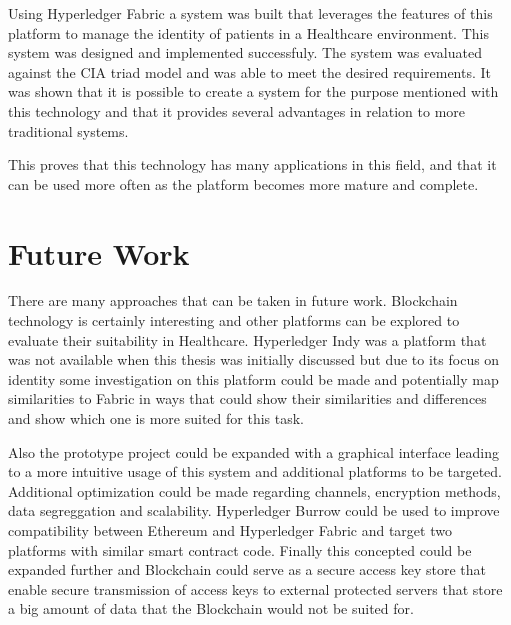 Using Hyperledger Fabric a system was built that leverages the features of this
platform to manage the identity of patients in a Healthcare environment. This
system was designed and implemented successfuly. The system was evaluated
against the CIA triad model and was able to meet the desired requirements. It
was shown that it is possible to create a system for the purpose mentioned with
this technology and that it provides several advantages in relation to more
traditional systems.

This proves that this technology has many applications in this field, and that
it can be used more often as the platform becomes more mature and complete.

\section{Future Work}

There are many approaches that can be taken in future work. Blockchain
technology is certainly interesting and other platforms can be explored to
evaluate their suitability in Healthcare. Hyperledger Indy was a platform that
was not available when this thesis was initially discussed but due to its focus
on identity some investigation on this platform could be made and potentially
map similarities to Fabric in ways that could show their similarities and
differences and show which one is more suited for this task.

Also the prototype project could be expanded with a graphical interface leading
to a more intuitive usage of this system and additional platforms to be
targeted. Additional optimization could be made regarding channels, encryption
methods, data segreggation and scalability. Hyperledger Burrow could be used to
improve compatibility between Ethereum and Hyperledger Fabric and target two
platforms with similar smart contract code. Finally this concepted could be
expanded further and Blockchain could serve as a secure access key store that
enable secure transmission of access keys to external protected servers that
store a big amount of data that the Blockchain would not be suited for.
